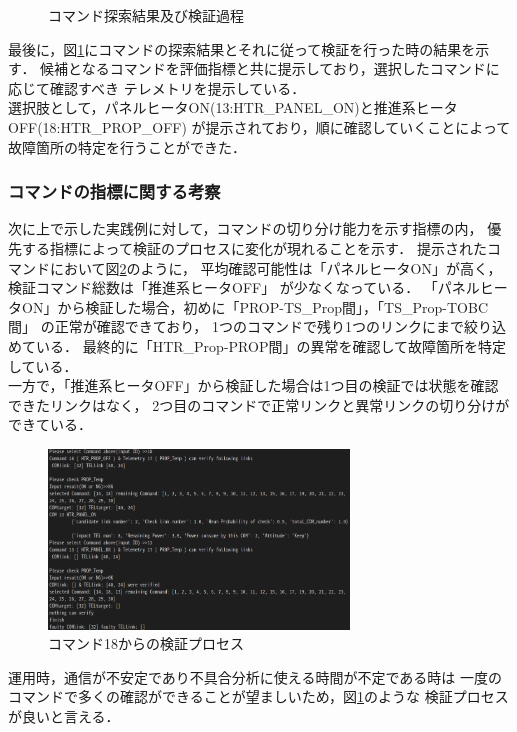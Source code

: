 \documentclass[11pt]{jsarticle}%
\begin{document}
\begin{multicols}{2}
\begin{figure}[H]
     \caption{コマンド探索結果及び検証過程}
     \label{fig:COM_phase}
 \end{figure}
 最後に，図\ref{fig:COM_phase}にコマンドの探索結果とそれに従って検証を行った時の結果を示す．
候補となるコマンドを評価指標と共に提示しており，選択したコマンドに応じて確認すべき
テレメトリを提示している．\\
選択肢として，パネルヒータON(13:HTR\_PANEL\_ON)と推進系ヒータOFF(18:HTR\_PROP\_OFF)
が提示されており，順に確認していくことによって故障箇所の特定を行うことができた．

\subsubsection{コマンドの指標に関する考察}
次に上で示した実践例に対して，コマンドの切り分け能力を示す指標の内，
優先する指標によって検証のプロセスに変化が現れることを示す．
提示されたコマンドにおいて図\ref{fig:COM_phase_18start}のように，
平均確認可能性は「パネルヒータON」が高く，検証コマンド総数は「推進系ヒータOFF」
が少なくなっている．
「パネルヒータON」から検証した場合，初めに「PROP-TS\_Prop間」，「TS\_Prop-TOBC間」%
の正常が確認できており，
1つのコマンドで残り1つのリンクにまで絞り込めている．%
最終的に「HTR\_Prop-PROP間」の異常を確認して故障箇所を特定している．\\
一方で，「推進系ヒータOFF」から検証した場合は1つ目の検証では状態を確認できたリンクはなく，
2つ目のコマンドで正常リンクと異常リンクの切り分けができている．
\begin{figure}[H]
  \centering
    \includegraphics[width=8.0cm]{../figure/COM14_TEL17_COM_COM_18start.png}
    \caption{コマンド18からの検証プロセス}
    \label{fig:COM_phase_18start}
\end{figure}
運用時，通信が不安定であり不具合分析に使える時間が不定である時は
一度のコマンドで多くの確認ができることが望ましいため，図\ref{fig:COM_phase}のような
検証プロセスが良いと言える．


\end{multicols}
\end{document}
